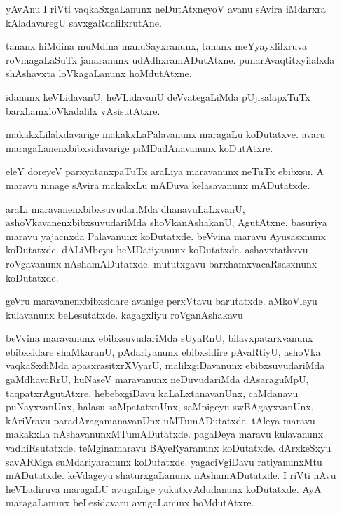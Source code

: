 \documentclass{article}
\begin{document}
\begin{mn}
yAvAnu  I riVti  vaqkaSxgaLanunx  neDutAtxneyoV  avanu  sAvira  iMdarxra  kAladavaregU  savxgaRdalilxrutAne.
\end{mn}

\begin{mn}
tananx  hiMdina  muMdina  manuSayxranunx,  tananx  meYyayxlilxruva  roVmagaLaSuTx  janaranunx  udAdhxramADutAtxne.  
punarAvaqtitxyilalxda  shAshavxta  loVkagaLanunx  hoMdutAtxne.
\end{mn}

\begin{mn}
idanunx  keVLidavanU,  heVLidavanU  deVvategaLiMda  pUjisalapxTuTx  barxhamxloVkadalilx  vAsisutAtxre.
\end{mn}

\begin{mn}
makakxLilalxdavarige  makakxLaPalavanunx  maragaLu  koDutatxve.  avaru  maragaLanenxbibxsidavarige  
piMDadAnavanunx  koDutAtxre.
\end{mn}

\begin{mn}
eleY  doreyeV  parxyatanxpaTuTx  araLiya  maravanunx  neTuTx  ebibxsu.  A  maravu  ninage  sAvira  
makakxLu  mADuva  kelasavanunx  mADutatxde. 
\end{mn}

\begin{mn}
araLi  maravanenxbibxsuvudariMda  dhanavuLaLxvanU,  ashoVkavanenxbibxsuvudariMda  shoVkanAshakanU,  
AgutAtxne.  basuriya  maravu  yajacnxda  Palavanunx  koDutatxde.  beVvina  maravu  Ayusasxnunx  
koDutatxde.  dALiMbeyu  heMDatiyanunx  koDutatxde.  ashavxtathxvu  roVgavanunx  nAshamADutatxde.  
mututxgavu  barxhamxvacaRsasxnunx  koDutatxde.
\end{mn}

\begin{mn}
geVru  maravanenxbibxsidare  avanige  perxVtavu  barutatxde.  aMkoVleyu  kulavanunx  beLesutatxde.  
kagagxliyu  roVganAshakavu
\end{mn}

\begin{mn}
beVvina  maravanunx  ebibxsuvudariMda  sUyaRnU,  bilavxpatarxvanunx  ebibxsidare  shaMkaranU,  
pAdariyanunx  ebibxsidire  pAvaRtiyU,  ashoVka vaqkaSxdiMda  apasxrasitxrXVyarU,  malilxgiDavanunx  
ebibxsuvudariMda  gaMdhavaRrU,  huNaseV  maravanunx  neDuvudariMda  dAsaraguMpU,  taqpatxrAgutAtxre.  
hebebxgiDavu  kaLaLxtanavanUnx,  caMdanavu  puNayxvanUnx,  halasu  saMpatatxnUnx,  saMpigeyu  
swBAgayxvanUnx,  kAriVravu  paradAragamanavanUnx  uMTumADutatxde.  tAleya  maravu  makakxLa  
nAshavanunxMTumADutatxde.  pagaDeya  maravu  kulavanunx  vadhiRsutatxde.  teMginamaravu  BAyeRyaranunx  
koDutatxde.  dArxkeSxyu  savARMga suMdariyaranunx  koDutatxde.  yagaciVgiDavu  ratiyanunxMtu mADutatxde.  
keVdageyu  shaturxgaLanunx  nAshamADutatxde.  I riVti  nAvu  heVLadiruva  maragaLU  avugaLige  
yukatxvAdudanunx  koDutatxde.  AyA  maragaLanunx  beLesidavaru  avugaLanunx  hoMdutAtxre.
\end{mn}
\end{document}

